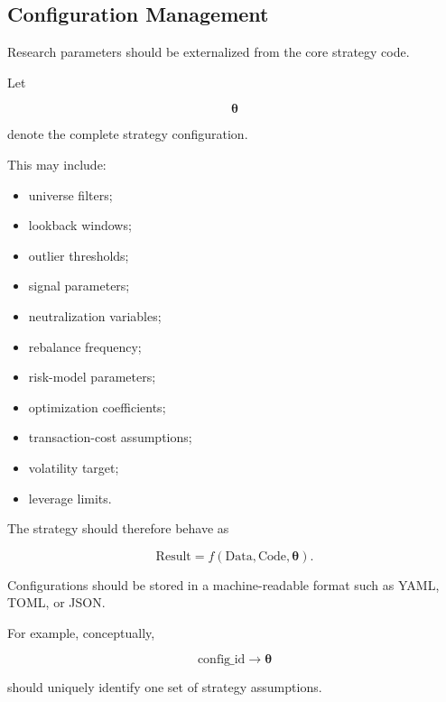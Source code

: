 \documentclass[11pt,a4paper]{article}
\begin{document}
\subsection{Configuration Management}
\label{subsec:configuration_management}

Research parameters should be externalized from the core strategy code.

Let

\begin{equation}
\boldsymbol{\theta}
\end{equation}

denote the complete strategy configuration.

This may include:

\begin{itemize}
    \item universe filters;
    \item lookback windows;
    \item outlier thresholds;
    \item signal parameters;
    \item neutralization variables;
    \item rebalance frequency;
    \item risk-model parameters;
    \item optimization coefficients;
    \item transaction-cost assumptions;
    \item volatility target;
    \item leverage limits.
\end{itemize}

The strategy should therefore behave as

\begin{equation}
\boxed{
\text{Result}
=
f
\left(
\text{Data},
\text{Code},
\boldsymbol{\theta}
\right).
}
\end{equation}

Configurations should be stored in a machine-readable format such as YAML, TOML,
or JSON.

For example, conceptually,

\begin{equation}
\boxed{
\text{config\_id}
\rightarrow
\boldsymbol{\theta}
}
\end{equation}

should uniquely identify one set of strategy assumptions.
\end{document}
